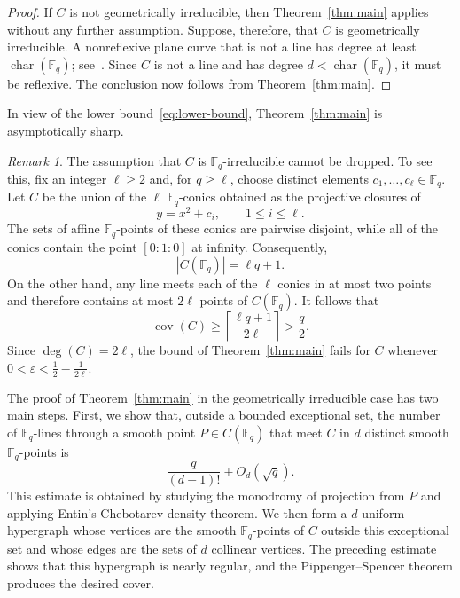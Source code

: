 \documentclass[10pt,a4paper]{amsart}
\theoremstyle{definition}
\theoremstyle{remark}
\newtheorem{remark}[theorem]{Remark}
\newcommand{\Fq}{\mathbb{F}_q}
\begin{document}
\begin{proof}
If $C$ is not geometrically irreducible, then Theorem~\ref{thm:main} applies without any further assumption. Suppose, therefore, that $C$ is geometrically irreducible. A nonreflexive plane curve that is not a line has degree at least $\operatorname{char}(\Fq)$; see~\cite[p.~5]{Hef89}. Since $C$ is not a line and has degree $d<\operatorname{char}(\Fq)$, it must be reflexive. The conclusion now follows from Theorem~\ref{thm:main}.
\end{proof}

In view of the lower bound~\eqref{eq:lower-bound}, Theorem~\ref{thm:main} is asymptotically sharp.

\begin{remark}\label{rem:Fq-irreducibility-necessary}
The assumption that $C$ is $\Fq$-irreducible cannot be dropped. To see this, fix an integer $\ell\geq 2$ and, for $q\geq\ell$, choose distinct elements $c_1,\ldots,c_\ell\in\Fq$. Let $C$ be the union of the $\ell$ $\Fq$-conics obtained as the projective closures of
\[
y=x^2+c_i,\qquad 1\leq i\leq\ell.
\]
The sets of affine $\Fq$-points of these conics are pairwise disjoint, while all of the conics contain the point $[0:1:0]$ at infinity. Consequently,
\[
|C(\Fq)|=\ell q+1.
\]
On the other hand, any line meets each of the $\ell$ conics in at most two points and therefore contains at most $2\ell$ points of $C(\Fq)$. It follows that
\[
\operatorname{cov}(C)
\geq
\left\lceil\frac{\ell q+1}{2\ell}\right\rceil
>
\frac{q}{2}.
\]
Since $\deg(C)=2\ell$, the bound of Theorem~\ref{thm:main} fails for $C$ whenever $0<\varepsilon<\frac12-\frac{1}{2\ell}$.
\end{remark}

The proof of Theorem~\ref{thm:main} in the geometrically irreducible case has two main steps. First, we show that, outside a bounded exceptional set, the number of $\Fq$-lines through a smooth point $P\in C(\Fq)$ that meet $C$ in $d$ distinct smooth $\Fq$-points is
\[
\frac{q}{(d-1)!}+O_d(\sqrt q).
\]
This estimate is obtained by studying the monodromy of projection from $P$ and applying Entin's Chebotarev density theorem. We then form a $d$-uniform hypergraph whose vertices are the smooth $\Fq$-points of $C$ outside this exceptional set and whose edges are the sets of $d$ collinear vertices. The preceding estimate shows that this hypergraph is nearly regular, and the Pippenger--Spencer theorem produces the desired cover.
\end{document}
